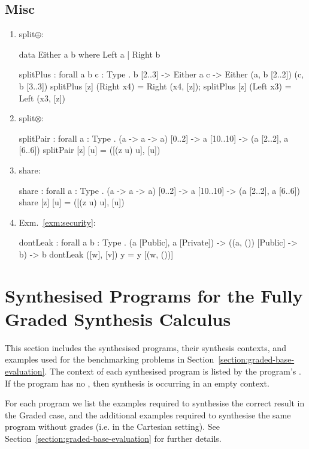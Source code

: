 \subsection{Misc}
\begin{enumerate}
\item split$\oplus$:
\begin{granule}
data Either a b where Left a | Right b

splitPlus : forall { a b c : Type }
          . b [2..3] 
          -> Either a c 
          -> Either (a, b [2..2]) (c, b [3..3])
splitPlus [z] (Right x4) = Right (x4, [z]);
splitPlus [z] (Left x3) = Left (x3, [z])
\end{granule}
\item split$\otimes$:
\begin{granule}
splitPair : forall { a : Type }
          . (a -> a -> a) [0..2] 
          -> a [10..10] 
          -> (a [2..2], a [6..6])
splitPair [z] [u] = ([(z u) u], [u])
\end{granule}
\item share:
\begin{granule}
share : forall { a : Type }
      . (a -> a -> a) [0..2] 
      -> a [10..10] 
      -> (a [2..2], a [6..6])
share [z] [u] = ([(z u) u], [u])
\end{granule}
\item Exm.~\ref{exm:security}:
\begin{granule}
dontLeak : forall { a b : Type }
         . (a [Public], a [Private]) 
         -> ((a, ()) [Public] -> b)
         -> b
dontLeak ([w], [v]) y = y [(w, ())]
\end{granule}
\end{enumerate}

\section{Synthesised Programs for the Fully Graded Synthesis Calculus}
\label{sec:graded-benchmarks}
This section includes the synthesised programs, their synthesis contexts, and
examples used for the benchmarking problems in
Section~\ref{section:graded-base-evaluation}. The context of each synthesised
program is listed by the program's . If the program has no
, then synthesis is occurring in an empty context.

For each program we list the examples required to synthesise the correct result
in the Graded case, and the additional examples required to synthesise the same
program without grades (i.e. in the Cartesian setting). See 
Section~\ref{section:graded-base-evaluation} for further details.

